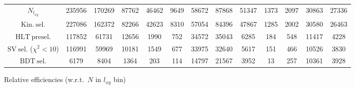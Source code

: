 \documentclass[10pt,a4paper]{article}
\begin{document}
\begin{landscape}
{\begin{tabular}{c|cccc|cccc|cccc}
\midrule
$N_{l_{xy}}$ & 235956 & 170269 & 87762 & 46462 & 9649 & 58672 & 87868 & 51347 & 1373 & 2097 & 30863 & 27336\\
$\mathrm{Kin.\ sel.}$ & 227086 & 162372 & 82266 & 42623 & 8310 & 57054 & 84396 & 47867 & 1285 & 2002 & 30580 & 26463\\
$\mathrm{HLT\ presel.}$ & 117852 & 61731 & 12656 & 1990 & 752 & 34572 & 35043 & 6285 & 184 & 548 & 11417 & 4228\\
$\mathrm{SV\ sel.}$ ($\chi^2{<}10$) & 116991 & 59969 & 10181 & 1549 & 677 & 33975 & 32640 & 5617 & 151 & 466 & 10526 & 3830\\
$\mathrm{BDT\ sel.}$ & 6179 & 8404 & 1364 & 203 & 114 & 14797 & 21567 & 3952 & 13 & 257 & 10361 & 3928\\
\bottomrule
\end{tabular}}

\vspace{18pt}

Relative efficiencies (w.r.t.\ $N$ in $l_{xy}$ bin)


\end{landscape}
\end{document}
